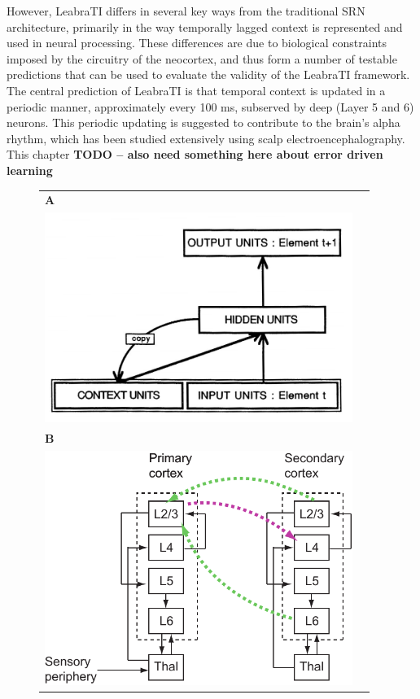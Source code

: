 \documentclass[dwyatte_dissertation.tex]{subfiles}
\begin{document}
However, LeabraTI differs in several key ways from the traditional SRN architecture, primarily in the way temporally lagged context is represented and used in neural processing. These differences are due to biological constraints imposed by the circuitry of the neocortex, and thus form a number of testable predictions that can be used to evaluate the validity of the LeabraTI framework. The central prediction of LeabraTI is that temporal context is updated in a periodic manner, approximately every 100 ms, subserved by deep (Layer 5 and 6) neurons. This periodic updating is suggested to contribute to the brain's alpha rhythm, which has been studied extensively using scalp electroencephalography. This chapter \textbf{TODO -- also need something here about error driven learning}

\begin{figure}[hp]
\centering
\begin{tabular}{ll}
\textbf{A} \\
\includegraphics[width=100mm]{figs/chap_leabrati/srn_scm.png} \\
\textbf{B} \\
\includegraphics[width=100mm]{figs/chap_leabrati/microcircuit_horiz.pdf} \\

\end{tabular}
\end{figure}
\end{document}
